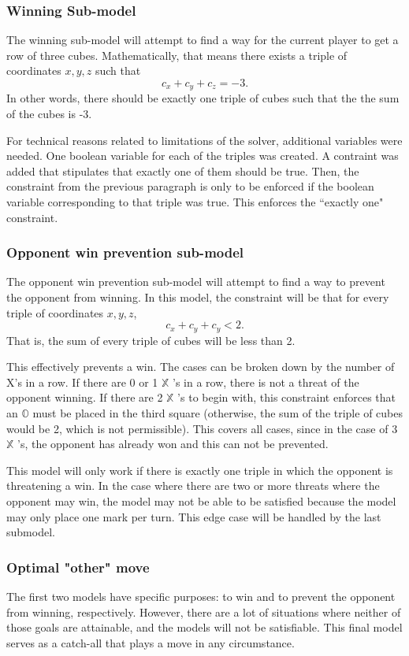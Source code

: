\documentclass[11pt]{article}
\newcommand{\XX}{$\mathbb{X}$ }
\newcommand{\OO}{$\mathbb{O}$ }
\begin{document}
\subsubsection{Winning Sub-model}
The winning sub-model will attempt to find a way for the current player to get a row of three cubes. Mathematically, that means there exists a triple of coordinates $x, y, z$ such that
$$ c_x + c_y + c_z = -3.$$
In other words, there should be exactly one triple of cubes such that the the sum of the cubes is -3.

For technical reasons related to limitations of the solver, additional variables were needed. One boolean variable for each of the triples was created. A contraint was added that stipulates that exactly one of them should be true. Then, the constraint from the previous paragraph is only to be enforced if the boolean variable corresponding to that triple was true. This enforces the ``exactly one" constraint.

\subsubsection{Opponent win prevention sub-model}
The opponent win prevention sub-model will attempt to find a way to prevent the opponent from winning. In this model, the constraint will be that for every triple of coordinates $x, y,z$, $$c_x + c_y + c_y < 2.$$ That is, the sum of every triple of cubes will be less than 2.

This effectively prevents a win. The cases can be broken down by the number of X's in a row. If there are 0 or 1 \XX's in a row, there is not a threat of the opponent winning. If there are 2 \XX's to begin with, this constraint enforces that an \OO must be placed in the third square (otherwise, the sum of the triple of cubes would be 2, which is not permissible). This covers all cases, since in the case of 3 \XX's, the opponent has already won and this can not be prevented. 

This model will only work if there is exactly one triple in which the opponent is threatening a win. In the case where there are two or more threats where the opponent may win, the model may not be able to be satisfied because the model may only place one mark per turn. This edge case will be handled by the last submodel.

\subsubsection{Optimal "other" move}
The first two models have specific purposes: to win and to prevent the opponent from winning, respectively. However, there are a lot of situations where neither of those goals are attainable, and the models will not be satisfiable. This final model serves as a catch-all that plays a move in any circumstance.
\end{document}
